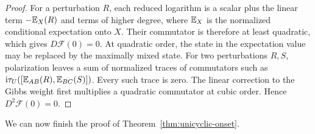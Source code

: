 \begin{proof}
For a perturbation $R$, each reduced logarithm is a scalar plus the linear
term $-\mathbb{E}_X(R)$ and terms of higher degree, where $\mathbb{E}_X$ is the normalized
conditional expectation onto $X$.  Their commutator is
therefore at least quadratic, which gives $D\mathcal F(0)=0$.  At quadratic
order, the state in the expectation value may be replaced by the maximally
mixed state.  For two perturbations $R,S$, polarization leaves a sum of
normalized traces of commutators such as
$\mathrm{i}\tau_U([\mathbb{E}_{AB}(R),\mathbb{E}_{BC}(S)])$.  Every such trace is
zero.  The linear correction to the Gibbs weight first multiplies a
quadratic commutator at cubic order.  Hence $D^2\mathcal F(0)=0$.
\end{proof}

We can now finish the proof of Theorem~\ref{thm:unicyclic-onset}.

